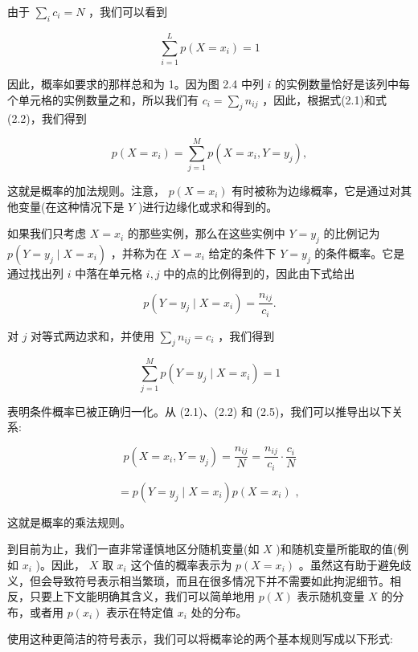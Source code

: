 \documentclass[10pt]{report}
\begin{document}
由于 \(\mathop{\sum }\limits_{i}{c}_{i} = N\) ，我们可以看到

\[
\mathop{\sum }\limits_{{i = 1}}^{L}p\left( {X = {x}_{i}}\right)  = 1 \tag{2.3}
\]

因此，概率如要求的那样总和为 1。因为图 2.4 中列 \(i\) 的实例数量恰好是该列中每个单元格的实例数量之和，所以我们有 \({c}_{i} = \mathop{\sum }\limits_{j}{n}_{ij}\) ，因此，根据式(2.1)和式(2.2)，我们得到

\[
p\left( {X = {x}_{i}}\right)  = \mathop{\sum }\limits_{{j = 1}}^{M}p\left( {X = {x}_{i},Y = {y}_{j}}\right) , \tag{2.4}
\]

这就是概率的加法规则。注意， \(p\left( {X = {x}_{i}}\right)\) 有时被称为边缘概率，它是通过对其他变量(在这种情况下是 \(Y\) )进行边缘化或求和得到的。

如果我们只考虑 \(X = {x}_{i}\) 的那些实例，那么在这些实例中 \(Y = {y}_{j}\) 的比例记为 \(p\left( {Y = {y}_{j} \mid  X = {x}_{i}}\right)\) ，并称为在 \(X = {x}_{i}\) 给定的条件下 \(Y = {y}_{j}\) 的条件概率。它是通过找出列 \(i\) 中落在单元格 \(i,j\) 中的点的比例得到的，因此由下式给出

\[
p\left( {Y = {y}_{j} \mid  X = {x}_{i}}\right)  = \frac{{n}_{ij}}{{c}_{i}}. \tag{2.5}
\]

对 \(j\) 对等式两边求和，并使用 \(\mathop{\sum }\limits_{j}{n}_{ij} = {c}_{i}\) ，我们得到

\[
\mathop{\sum }\limits_{{j = 1}}^{M}p\left( {Y = {y}_{j} \mid  X = {x}_{i}}\right)  = 1 \tag{2.6}
\]

表明条件概率已被正确归一化。从 (2.1)、(2.2) 和 (2.5)，我们可以推导出以下关系:

\[
p\left( {X = {x}_{i},Y = {y}_{j}}\right)  = \frac{{n}_{ij}}{N} = \frac{{n}_{ij}}{{c}_{i}} \cdot  \frac{{c}_{i}}{N}
\]

\[
= p\left( {Y = {y}_{j} \mid  X = {x}_{i}}\right) p\left( {X = {x}_{i}}\right) \text{ , } \tag{2.7}
\]

这就是概率的乘法规则。

到目前为止，我们一直非常谨慎地区分随机变量(如 \(X\) )和随机变量所能取的值(例如 \({x}_{i}\) )。因此， \(X\) 取 \({x}_{i}\) 这个值的概率表示为 \(p\left( {X = {x}_{i}}\right)\) 。虽然这有助于避免歧义，但会导致符号表示相当繁琐，而且在很多情况下并不需要如此拘泥细节。相反，只要上下文能明确其含义，我们可以简单地用 \(p\left( X\right)\) 表示随机变量 \(X\) 的分布，或者用 \(p\left( {x}_{i}\right)\) 表示在特定值 \({x}_{i}\) 处的分布。

使用这种更简洁的符号表示，我们可以将概率论的两个基本规则写成以下形式:
\end{document}
